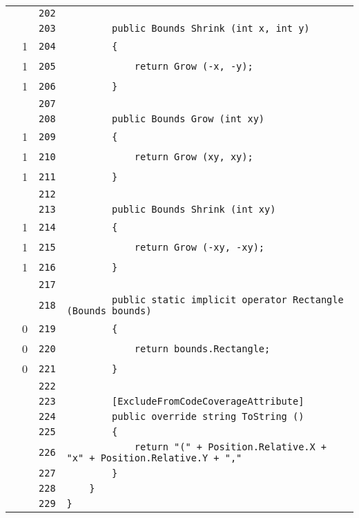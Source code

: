 \documentclass[a4paper,10pt]{article}
\begin{document}
\begin{longtable}[l]{lrrl}
\cellcolor{gray} &  & \verb~202~ & \verb~~\\
\cellcolor{gray} &  & \verb~203~ & \verb~        public Bounds Shrink (int x, int y)~\\
\cellcolor{green} & 1 & \verb~204~ & \verb~        {~\\
\cellcolor{green} & 1 & \verb~205~ & \verb~            return Grow (-x, -y);~\\
\cellcolor{green} & 1 & \verb~206~ & \verb~        }~\\
\cellcolor{gray} &  & \verb~207~ & \verb~~\\
\cellcolor{gray} &  & \verb~208~ & \verb~        public Bounds Grow (int xy)~\\
\cellcolor{green} & 1 & \verb~209~ & \verb~        {~\\
\cellcolor{green} & 1 & \verb~210~ & \verb~            return Grow (xy, xy);~\\
\cellcolor{green} & 1 & \verb~211~ & \verb~        }~\\
\cellcolor{gray} &  & \verb~212~ & \verb~~\\
\cellcolor{gray} &  & \verb~213~ & \verb~        public Bounds Shrink (int xy)~\\
\cellcolor{green} & 1 & \verb~214~ & \verb~        {~\\
\cellcolor{green} & 1 & \verb~215~ & \verb~            return Grow (-xy, -xy);~\\
\cellcolor{green} & 1 & \verb~216~ & \verb~        }~\\
\cellcolor{gray} &  & \verb~217~ & \verb~~\\
\cellcolor{gray} &  & \verb~218~ & \verb~        public static implicit operator Rectangle (Bounds bounds)~\\
\cellcolor{red} & 0 & \verb~219~ & \verb~        {~\\
\cellcolor{red} & 0 & \verb~220~ & \verb~            return bounds.Rectangle;~\\
\cellcolor{red} & 0 & \verb~221~ & \verb~        }~\\
\cellcolor{gray} &  & \verb~222~ & \verb~~\\
\cellcolor{gray} &  & \verb~223~ & \verb~        [ExcludeFromCodeCoverageAttribute]~\\
\cellcolor{gray} &  & \verb~224~ & \verb~        public override string ToString ()~\\
\cellcolor{gray} &  & \verb~225~ & \verb~        {~\\
\cellcolor{gray} &  & \verb~226~ & \verb~            return "(" + Position.Relative.X + "x" + Position.Relative.Y + ","~\\
\cellcolor{gray} &  & \verb~227~ & \verb~        }~\\
\cellcolor{gray} &  & \verb~228~ & \verb~    }~\\
\cellcolor{gray} &  & \verb~229~ & \verb~}~\\
\end{longtable}
\newpage
\end{document}
